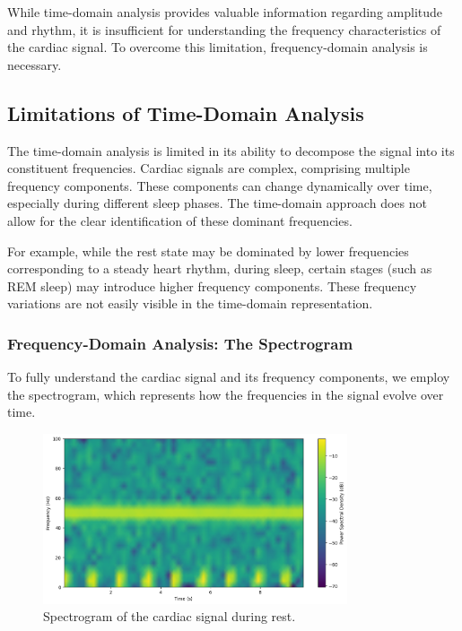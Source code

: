 \documentclass[10pt]{article}
\theoremstyle{definition}
\theoremstyle{remark}
\theoremstyle{definition}
\numberwithin{equation}{prob}
\begin{document}
While time-domain analysis provides valuable information regarding amplitude and rhythm, it is insufficient for understanding the frequency characteristics of the cardiac signal. To overcome this limitation, frequency-domain analysis is necessary.

\subsection{Limitations of Time-Domain Analysis}

The time-domain analysis is limited in its ability to decompose the signal into its constituent frequencies. Cardiac signals are complex, comprising multiple frequency components. These components can change dynamically over time, especially during different sleep phases. The time-domain approach does not allow for the clear identification of these dominant frequencies.

For example, while the rest state may be dominated by lower frequencies corresponding to a steady heart rhythm, during sleep, certain stages (such as REM sleep) may introduce higher frequency components. These frequency variations are not easily visible in the time-domain representation.

\subsubsection{Frequency-Domain Analysis: The Spectrogram}

To fully understand the cardiac signal and its frequency components, we employ the spectrogram, which represents how the frequencies in the signal evolve over time.

\begin{figure}[H]
    \centering
    \includegraphics[width=0.8\textwidth]{./figures/Spectogram Rest.png}
    \caption{Spectrogram of the cardiac signal during rest.}
    \label{fig:spectrogram_rest}
\end{figure}
\end{document}
